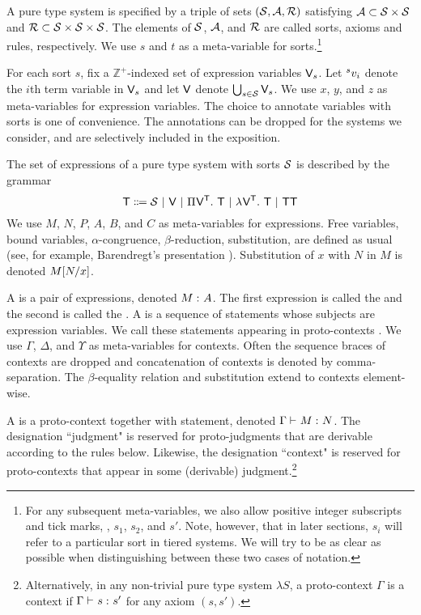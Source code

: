 \documentclass{article}
\begin{document}
A pure type system is specified by a triple of sets $(\sorts, \axioms, \rules)$ satisfying $\axioms \subset \sorts \times \sorts$ and $\rules \subset \sorts \times \sorts \times \sorts$.
The elements of $\sorts$, $\axioms$, and $\rules$ are called sorts, axioms and rules, respectively.
We use $s$ and $t$ as a meta-variable for sorts.\footnote{For any subsequent meta-variables, we also allow positive integer subscripts and tick marks, \eg, $s_1$, $s_2$, and $s'$. Note, however, that in later sections, $s_i$ will refer to a particular sort in tiered systems. We will try to be as clear as possible when distinguishing between these two cases of notation.}

For each sort $s$, fix a $\mathbb Z^+$-indexed set of expression variables $\vars_s$.
Let $\var[s]{v_i}$ denote the $i$th term variable in $\vars_s$ and let $\vars$ denote $\bigcup_{s \in \sorts} \vars_s$.
We use $x$, $y$, and $z$ as meta-variables for expression variables.
The choice to annotate variables with sorts is one of convenience.
The annotations can be dropped for the systems we consider, and are selectively included in the exposition.

The set of expressions of a pure type system with sorts $\sorts$ is described by the grammar
\[
\terms \bnfeq
    \sorts \sbar
    \vars \sbar
    \PiT \vars \terms \terms \sbar
    \lambdaT \vars \terms \terms \sbar
    \terms \terms
\]
We use $M$, $N$, $P$, $A$, $B$, and $C$ as meta-variables for expressions.
Free variables, bound variables, $\alpha$-congruence, $\beta$-reduction, substitution, \etc are defined as usual (see, for example, Barendregt's presentation \cite{barendregt-1993}).
Substitution of $x$ with $N$ in $M$ is denoted $\sub M N x$.

A  is a pair of expressions, denoted $\statement M A$.
The first expression is called the  and the second is called the .
A  is a sequence of statements whose subjects are expression variables.
We call these statements appearing in proto-contexts .
We use $\Gamma$, $\Delta$, and $\Upsilon$ as meta-variables for contexts.
Often the sequence braces of contexts are dropped and concatenation of contexts is denoted by comma-separation.
The $\beta$-equality relation and substitution extend to contexts element-wise.

A  is a proto-context together with statement, denoted $\judgment \Gamma M N$.
The designation ``judgment" is reserved for proto-judgments that are derivable according to the rules below.
Likewise, the designation ``context" is reserved for proto-contexts that appear in some (derivable) judgment.\footnote{Alternatively, in any non-trivial pure type system $\lambda S$, a proto-context $\Gamma$ is a context if $\judgment \Gamma s {s'}$ for any axiom $(s, s')$.}
\end{document}

